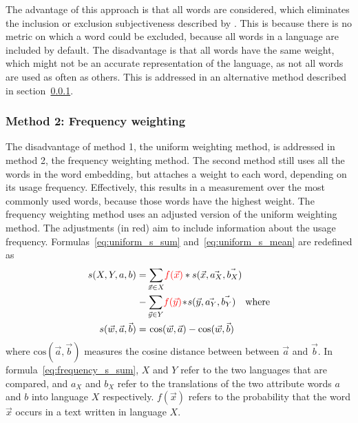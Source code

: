 The advantage of this approach is
that all words are considered, which eliminates the inclusion or exclusion subjectiveness
described by \textcite{nissim_fair_is_better_2020}.  This is because there is no metric
on which a word could be excluded, because all words in a language are included by default.
The disadvantage is that all words have the same weight, which might not be an accurate
representation of the language, as not all words are used as often as others. This is
addressed in an alternative method described in section~\ref{method:2}.

\subsubsection{Method 2: Frequency weighting}
\label{method:2}
The disadvantage of method 1, the uniform weighting method, is addressed in method 2,
the frequency weighting method.
The second method still uses all the words in the word embedding, but attaches a
weight to
each word, depending on its usage frequency. Effectively, this results in a measurement
over the most commonly used words, because those words have the highest weight.
The frequency weighting method uses an adjusted version of the uniform weighting method.
The adjustments (in red) aim to include information about the usage frequency.
Formulas~\eqref{eq:uniform_s_sum} and~\eqref{eq:uniform_s_mean} are redefined
as
\begin{align} \label{eq:frequency_s_sum}
    s(X,Y,a,b) =& \displaystyle\sum_{\vec{x} \in X}\! \textcolor{red}{f(\vec{x})}*s(\vec{x},\vec{a_X},\vec{b_X})
    \nonumber \\
    -& \displaystyle\sum_{\vec{y} \in Y}\! \textcolor{red}{f(\vec{y})}\! *\! s(\vec{y},\vec{a_Y},\vec{b_Y})
    \quad\text{where} \\
\label{eq:frequency_s_mean}
s(\vec{w},\vec{a},\vec{b}) =&\ \text{cos}(\vec{w}, \vec{a}) - \text{cos}(\vec{w}, \vec{b})
\end{align}
where $\text{cos}(\vec{a}, \vec{b})$ measures the cosine distance between between
$\vec{a}$ and $\vec{b}$. 
In formula~\eqref{eq:frequency_s_sum}, $X$ and $Y$ refer to the two languages that are
compared, and $a_X$ and $b_X$ refer to the translations of the
two attribute words $a$ and $b$ into language $X$ respectively. 
$f(\vec{x})$ refers to the probability that the word $\vec{x}$ occurs in a text written
in language $X$.

